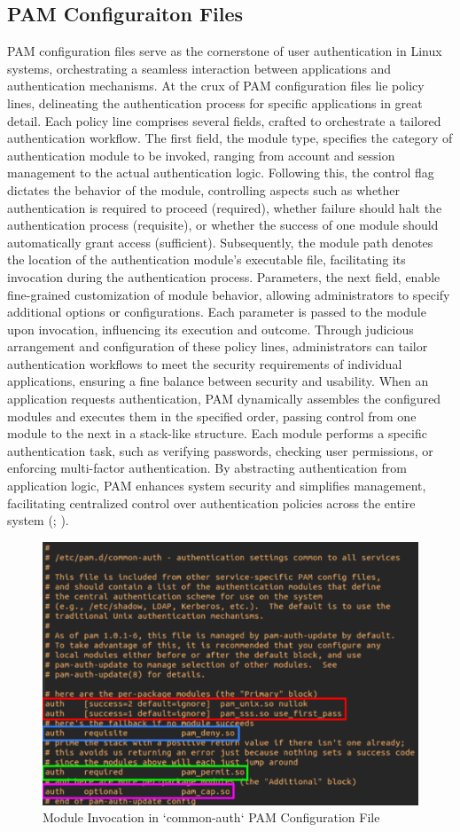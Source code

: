 \documentclass[
]{article}
\begin{document}
\begin{multicols}{2}

\section{PAM Configuraiton Files}
PAM configuration files serve as the cornerstone of user authentication in Linux systems, orchestrating a seamless interaction between applications and authentication mechanisms. At the crux of PAM configuration files lie policy lines, delineating the authentication process for specific applications in great detail. Each policy line comprises several fields, crafted to orchestrate a tailored authentication workflow. The first field, the module type, specifies the category of authentication module to be invoked, ranging from account and session management to the actual authentication logic. Following this, the control flag dictates the behavior of the module, controlling aspects such as whether authentication is required to proceed (required), whether failure should halt the authentication process (requisite), or whether the success of one module should automatically grant access (sufficient). Subsequently, the module path denotes the location of the authentication module's executable file, facilitating its invocation during the authentication process. Parameters, the next field, enable fine-grained customization of module behavior, allowing administrators to specify additional options or configurations. Each parameter is passed to the module upon invocation, influencing its execution and outcome. Through judicious arrangement and configuration of these policy lines, administrators can tailor authentication workflows to meet the security requirements of individual applications, ensuring a fine balance between security and usability. When an application requests authentication, PAM dynamically assembles the configured modules and executes them in the specified order, passing control from one module to the next in a stack-like structure. Each module performs a specific authentication task, such as verifying passwords, checking user permissions, or enforcing multi-factor authentication. By abstracting authentication from application logic, PAM enhances system security and simplifies management, facilitating centralized control over authentication policies across the entire system (\cite{stallings2020}; \cite{love2010}).

\end{multicols}

\begin{figure}[htbp]
  \centering
  \includegraphics[width=0.4\linewidth]{images/common-auth.png}
  \caption{Module Invocation in `common-auth` PAM Configuration File}
\end{figure}
\end{document}
